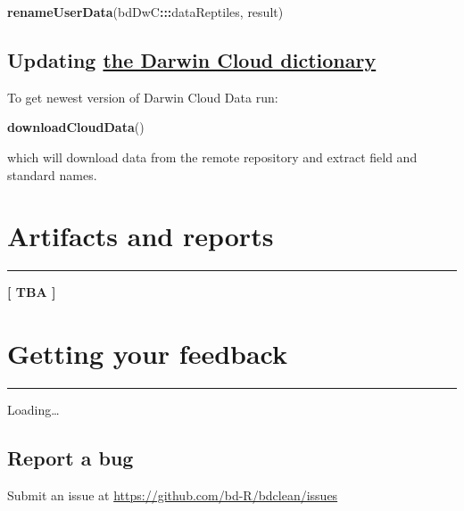 \documentclass[]{book}
\newenvironment{Shaded}{\begin{snugshade}}{\end{snugshade}}
\newcommand{\KeywordTok}[1]{\textcolor[rgb]{0.13,0.29,0.53}{\textbf{#1}}}
\newcommand{\OperatorTok}[1]{\textcolor[rgb]{0.81,0.36,0.00}{\textbf{#1}}}
\newcommand{\NormalTok}[1]{#1}
\begin{document}
\begin{Shaded}
\begin{Highlighting}[]
\KeywordTok{renameUserData}\NormalTok{(bdDwC}\OperatorTok{:::}\NormalTok{dataReptiles, result)}
\end{Highlighting}
\end{Shaded}

\section{\texorpdfstring{Updating
\protect\hyperlink{the-darwin-cloud-dictionary}{the Darwin Cloud
dictionary}}{Updating the Darwin Cloud dictionary}}\label{updating-the-darwin-cloud-dictionary-1}

To get newest version of Darwin Cloud Data run:

\begin{Shaded}
\begin{Highlighting}[]
\KeywordTok{downloadCloudData}\NormalTok{()}
\end{Highlighting}
\end{Shaded}

which will download data from the remote repository and extract field
and standard names.

\chapter{Artifacts and reports}\label{artifacts-and-reports}

\begin{center}\rule{0.5\linewidth}{\linethickness}\end{center}

\textbf{{{[} TBA {]}}}

\chapter{Getting your feedback}\label{getting-your-feedback}

\begin{center}\rule{0.5\linewidth}{\linethickness}\end{center}

Loading\ldots{}

\section{Report a bug}\label{report-a-bug}

Submit an issue at \url{https://github.com/bd-R/bdclean/issues}
\end{document}
